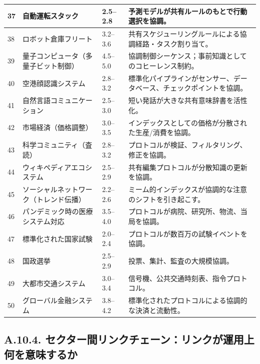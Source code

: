 \documentclass[13pt,a4paper]{ltjsarticle}
\begin{document}
\begin{longtable}{|p{0.8cm}|p{6.2cm}|p{3.0cm}|p{5.7cm}|}
	\hline
	37 & 自動運転スタック & 2.5--2.8 & 予測モデルが共有ルールのもとで行動選択を協調。 \\
	\hline
	38 & ロボット倉庫フリート & 3.2--3.6 & 共有スケジューリングルールによる協調経路・タスク割り当て。 \\
	\hline
	39 & 量子コンピュータ（多量子ビット制御） & 4.5--5.0 & 協調制御シーケンス；事前知識としてのコヒーレンス制約。 \\
	\hline
	40 & 空港顔認識システム & 2.8--3.2 & 標準化パイプラインがセンサー、データベース、チェックポイントを協調。 \\
	\hline
	41 & 自然言語コミュニケーション & 2.5--3.0 & 短い発話が大きな共有意味辞書を活性化。 \\
	\hline
	42 & 市場経済（価格調整） & 3.0--3.5 & インデックスとしての価格が分散された生産/消費を協調。 \\
	\hline
	43 & 科学コミュニティ（査読） & 2.8--3.2 & プロトコルが検証、フィルタリング、修正を協調。 \\
	\hline
	44 & ウィキペディアエコシステム & 2.5--2.9 & 共有編集プロトコルが分散知識の更新を協調。 \\
	\hline
	45 & ソーシャルネットワーク（トレンド伝播） & 2.2--2.6 & ミーム的インデックスが協調的な注意のシフトを引き起こす。 \\
	\hline
	46 & パンデミック時の医療システム対応 & 3.5--4.0 & プロトコルが病院、研究所、物流、当局を協調。 \\
	\hline
	47 & 標準化された国家試験 & 2.0--2.4 & プロトコルが数百万の試験イベントを協調。 \\
	\hline
	48 & 国政選挙 & 2.5--2.9 & 投票、集計、監査の大規模協調。 \\
	\hline
	49 & 大都市交通システム & 3.0--3.4 & 信号機、公共交通時刻表、指令プロトコル。 \\
	\hline
	50 & グローバル金融システム & 3.8--4.2 & 標準化されたプロトコルによる協調的な決済と流動性。 \\
	\hline
\end{longtable}
	
	\subsection*{A.10.4. セクター間リンクチェーン：リンクが運用上何を意味するか}
	
\end{document}
